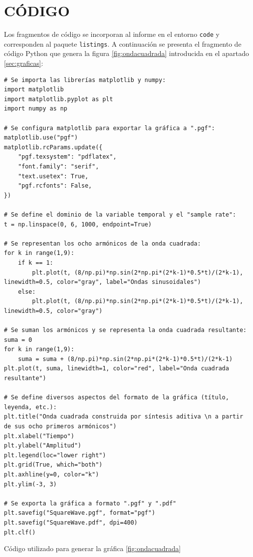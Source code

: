 \documentclass[a4paper, 11pt, spanish, twoside]{article}
\begin{document}



\newpage
\section{CÓDIGO} \label{sec:codigo}

Los  fragmentos de código se incorporan al informe en el entorno \texttt{code} y corresponden al paquete \texttt{listings}. A continuación se presenta el fragmento de código Python que genera la figura \ref{fig:ondacuadrada} introducida en el apartado \ref{sec:graficas}:

\vspace{-5pt}

\begin{code}[H]
\begin{lstlisting}[firstnumber=1, breakindent=55pt]
# Se importa las librerías matplotlib y numpy:
import matplotlib
import matplotlib.pyplot as plt
import numpy as np

# Se configura matplotlib para exportar la gráfica a ".pgf":
matplotlib.use("pgf")
matplotlib.rcParams.update({
    "pgf.texsystem": "pdflatex",
    "font.family": "serif",
    "text.usetex": True,
    "pgf.rcfonts": False,
})

# Se define el dominio de la variable temporal y el "sample rate":
t = np.linspace(0, 6, 1000, endpoint=True)

# Se representan los ocho armónicos de la onda cuadrada:
for k in range(1,9):
    if k == 1:
        plt.plot(t, (8/np.pi)*np.sin(2*np.pi*(2*k-1)*0.5*t)/(2*k-1), linewidth=0.5, color="gray", label="Ondas sinusoidales")
    else:
        plt.plot(t, (8/np.pi)*np.sin(2*np.pi*(2*k-1)*0.5*t)/(2*k-1), linewidth=0.5, color="gray")

# Se suman los armónicos y se representa la onda cuadrada resultante:
suma = 0 
for k in range(1,9):
    suma = suma + (8/np.pi)*np.sin(2*np.pi*(2*k-1)*0.5*t)/(2*k-1)
plt.plot(t, suma, linewidth=1, color="red", label="Onda cuadrada resultante")

# Se define diversos aspectos del formato de la gráfica (título, leyenda, etc.):
plt.title("Onda cuadrada construida por síntesis aditiva \n a partir de sus ocho primeros armónicos")
plt.xlabel("Tiempo")
plt.ylabel("Amplitud")
plt.legend(loc="lower right")
plt.grid(True, which="both")
plt.axhline(y=0, color="k")
plt.ylim(-3, 3)

# Se exporta la gráfica a formato ".pgf" y ".pdf"
plt.savefig("SquareWave.pgf", format="pgf")
plt.savefig("SquareWave.pdf", dpi=400)
plt.clf()
\end{lstlisting}
\vspace{-5pt}
\caption{Código utilizado para generar la gráfica \ref{fig:ondacuadrada}}
\label{cod:ondacuadrada}
\end{code}
\end{document}
